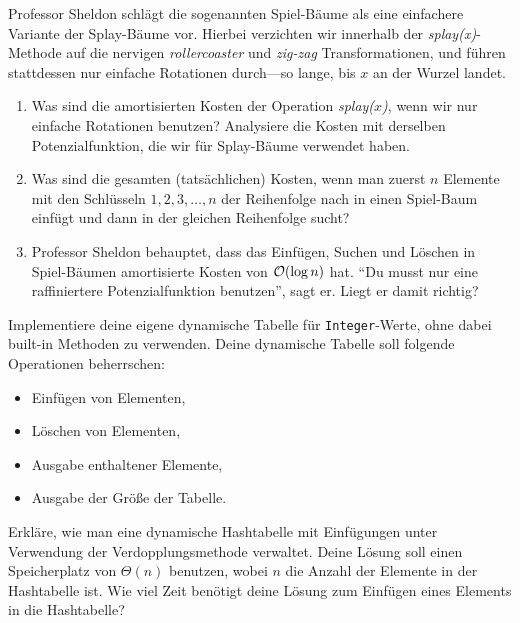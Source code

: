 \documentclass{uebung_cs}
\begin{document}
\begin{aufgabe}
	Professor Sheldon schlägt die sogenannten Spiel-Bäume als eine einfachere Variante der Splay-Bäume vor. Hierbei verzichten wir innerhalb der \emph{splay(x)}-Methode auf die nervigen \emph{rollercoaster} und \emph{zig-zag} Transformationen, und führen stattdessen nur einfache Rotationen durch---so lange, bis $x$ an der Wurzel landet.
	\begin{enumerate}
		\item Was sind die amortisierten Kosten der Operation \emph{splay($x$)}, wenn wir nur einfache Rotationen benutzen? Analysiere die Kosten mit derselben Potenzialfunktion, die wir für Splay-Bäume verwendet haben.
		\item Was sind die gesamten (tatsächlichen) Kosten, wenn man zuerst $n$ Elemente mit den Schlüsseln $1,2,3,\dots,n$ der Reihenfolge nach in einen Spiel-Baum einfügt und dann in der gleichen Reihenfolge sucht?
		\item Professor Sheldon behauptet, dass das Einfügen, Suchen und Löschen in Spiel-Bäumen amortisierte Kosten von $\mathcal{O}(\log n)$ hat. \enquote{Du musst nur eine raffiniertere Potenzialfunktion benutzen}, sagt er. Liegt er damit richtig?
	\end{enumerate}
\end{aufgabe}

\begin{aufgabe}
	Implementiere deine eigene dynamische Tabelle für \texttt{Integer}-Werte, ohne dabei built-in Methoden zu verwenden. Deine dynamische Tabelle soll folgende Operationen beherrschen:
	\begin{itemize}
		\item Einfügen von Elementen,
		\item Löschen von Elementen,
		\item Ausgabe enthaltener Elemente,
		\item Ausgabe der Größe der Tabelle.
	\end{itemize}
\end{aufgabe}

\begin{aufgabe}
	Erkläre, wie man eine dynamische Hashtabelle mit Einfügungen unter Verwendung der Verdopplungsmethode verwaltet. Deine Lösung soll einen Speicherplatz von $\Theta(n)$ benutzen, wobei $n$ die Anzahl der Elemente in der Hashtabelle ist. Wie viel Zeit benötigt deine Lösung zum Einfügen eines Elements in die Hashtabelle?
\end{aufgabe}
\end{document}
